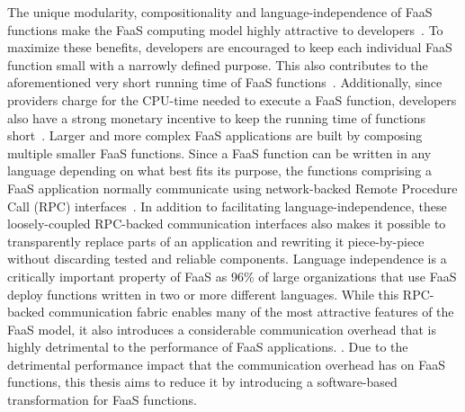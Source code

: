 \documentclass[../main.tex]{subfiles}
\begin{document}
\begin{refsection}
The unique modularity, compositionality and language-independence of
FaaS functions make the FaaS computing model highly attractive to
developers~\cite{williams16_growin_need_micros_bioin}. To maximize
these benefits, developers are encouraged to keep each individual FaaS
function small with a narrowly defined purpose. This also contributes
to the aforementioned very short running time of FaaS
functions~\cite{shahrad19_archit_implic_funct_servic_comput,mahgoub22_wisef,shahrad20_server_wild,lukewarm_serverless,du20_catal}. Additionally,
since providers charge for the CPU-time needed to execute a FaaS
function, developers also have a strong monetary incentive to keep the
running time of functions short~\cite{faas_procing}.  Larger and more
complex FaaS applications are built by composing multiple smaller FaaS
functions. Since a FaaS function can be written in any language
depending on what best fits its purpose, the functions comprising a
FaaS application normally communicate using network-backed Remote
Procedure Call (RPC)
interfaces~\cite{gan19_open_sourc_bench_suite_micros}. In addition to
facilitating language-independence, these loosely-coupled RPC-backed
communication interfaces also makes it possible to transparently
replace parts of an application and rewriting it piece-by-piece
without discarding tested and reliable components. Language
independence is a critically important property of FaaS as 96\% of
large organizations that use FaaS deploy functions written in two or
more different languages\cite{serverless_state}. While this RPC-backed
communication fabric enables many of the most attractive features of
the FaaS model, it also introduces a considerable communication
overhead that is highly detrimental to the performance of FaaS
applications.  . Due
to the detrimental performance impact that the communication overhead
has on FaaS functions, this thesis aims to reduce it by introducing a
software-based transformation for FaaS functions.





\end{refsection}
\end{document}
